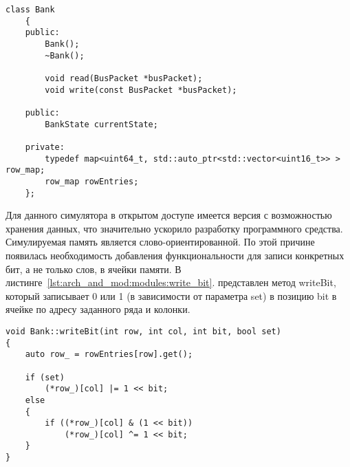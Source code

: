 \begin{lstlisting}[style=cplusplusstyle, caption={Класс Bank}, label=lst:arch_and_mod:modules:bank]
class Bank
    {
    public:
        Bank();
        ~Bank();

        void read(BusPacket *busPacket);
        void write(const BusPacket *busPacket);

    public:
        BankState currentState;

    private:
        typedef map<uint64_t, std::auto_ptr<std::vector<uint16_t>> > row_map;
        row_map rowEntries;
    };
\end{lstlisting}

Для данного симулятора в открытом доступе имеется версия с возможностью хранения данных, что значительно ускорило разработку программного средства. Симулируемая память является слово-ориентированной. По этой причине появилась необходимость добавления функциональности для записи конкретных бит, а не только слов, в ячейки памяти. В листинге~\ref{lst:arch_and_mod:modules:write_bit}. представлен метод writeBit, который записывает 0 или 1 (в зависимости от параметра set) в позицию bit в ячейке по адресу заданного ряда и колонки.

\begin{lstlisting}[style=cplusplusstyle, caption={Метод записи конкретных бит в слове}, label=lst:arch_and_mod:modules:write_bit]
void Bank::writeBit(int row, int col, int bit, bool set)
{
    auto row_ = rowEntries[row].get();

    if (set)
        (*row_)[col] |= 1 << bit;
    else
    {
        if ((*row_)[col] & (1 << bit))
            (*row_)[col] ^= 1 << bit;
    }
}
\end{lstlisting}

